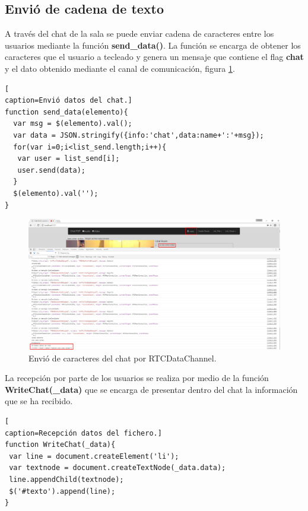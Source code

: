 \subsection*{Envió de cadena de texto}
A través del chat de la sala se puede enviar cadena de caracteres entre los usuarios  mediante la función \textbf{send\_data()}. La función se encarga de obtener los caracteres que el usuario a tecleado y genera un mensaje que contiene el flag \textbf{chat} y el dato obtenido mediante el canal de comunicación, figura \ref{fig:ChatClienteSend}.
\begin{lstlisting}[
caption=Envió datos del chat.]
function send_data(elemento){
  var msg = $(elemento).val();
  var data = JSON.stringify({info:'chat',data:name+':'+msg});
  for(var i=0;i<list_send.length;i++){
   var user = list_send[i];
   user.send(data);
  }
  $(elemento).val('');
}
\end{lstlisting}
\begin{figure}[!h]
\centering
\includegraphics[width=0.8\linewidth]{Figures/ChatClienteSend}
\decoRule
\caption[Envió de caracteres del chat por RTCDataChannel.]{Envió de caracteres del chat por RTCDataChannel.}
\label{fig:ChatClienteSend}
\end{figure}
La recepción por parte de los usuarios se realiza por medio de la función \textbf{WriteChat(\_data)} que se encarga de presentar dentro del chat la información que se ha recibido.
\begin{lstlisting}[
caption=Recepción datos del fichero.]
function WriteChat(_data){
 var line = document.createElement('li');
 var textnode = document.createTextNode(_data.data);
 line.appendChild(textnode);
 $('#texto').append(line);
}
\end{lstlisting}
